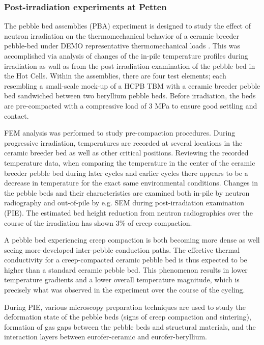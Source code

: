\subsubsection{Post-irradiation experiments at Petten}
The pebble bed assemblies (PBA) experiment is designed to study the effect of neutron irradiation on the thermomechanical behavior of a ceramic breeder pebble-bed under DEMO representative thermomechanical loads \cite{Magielsen2007}. This was accomplished via analysis of changes of the in-pile temperature profiles during irradiation as wall as from the post irradiation examination of the pebble bed in the Hot Cells. Within the assemblies, there are four test elements; each resembling a small-scale mock-up of a HCPB TBM with a ceramic breeder pebble bed sandwiched between two beryllium pebble beds. Before irradiation, the beds are pre-compacted with a compressive load of 3 MPa to ensure good settling and contact.  

FEM analysis was performed to study pre-compaction procedures.  During progressive irradiation, temperatures are recorded at several locations in the ceramic breeder bed as well as other critical positions. Reviewing the recorded temperature data, when comparing the temperature in the center of the ceramic breeder pebble bed during later cycles and earlier cycles there appears to be a decrease in temperature for the exact same environmental conditions. Changes in the pebble beds and their characteristics are examined both in-pile by neutron radiography and out-of-pile by e.g. SEM during post-irradiation examination (PIE). The estimated bed height reduction from neutron radiographies over the course of the irradiation has shown 3\% of creep compaction. 

A pebble bed experiencing creep compaction is both becoming more dense as well seeing more-developed inter-pebble conduction paths. The effective thermal conductivity for a creep-compacted ceramic pebble bed is thus expected to be higher than a standard ceramic pebble bed. This phenomenon results in lower temperature gradients and a lower overall temperature magnitude, which is precisely what was observed in the experiment over the course of the cycling. 

During PIE, various microscopy preparation techniques are used to study the deformation state of the pebble beds (signs of creep compaction and sintering), formation of gas gaps between the pebble beds and structural materials, and the interaction layers between eurofer-ceramic and eurofer-beryllium. 

